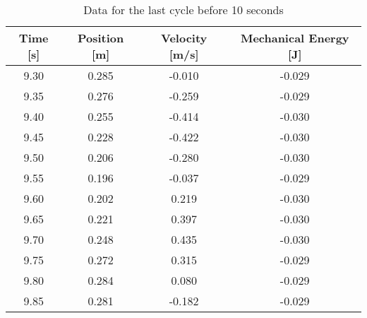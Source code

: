 \documentclass{article}
\begin{document}
            \begin{table}[H]
                \centering
                \begin{tabular}{|c|c|c|c|}
                    \hline
                    Time [s] & Position [m] & Velocity [m/s] & Mechanical Energy [J] \\
                    \hline
                    9.30     & 0.285        & -0.010         & -0.029                \\
                    \hline
                    9.35     & 0.276        & -0.259         & -0.029                \\
                    \hline
                    9.40     & 0.255        & -0.414         & -0.030                \\
                    \hline
                    9.45     & 0.228        & -0.422         & -0.030                \\
                    \hline
                    9.50     & 0.206        & -0.280         & -0.030                \\
                    \hline
                    9.55     & 0.196        & -0.037         & -0.029                \\
                    \hline
                    9.60     & 0.202        & 0.219          & -0.030                \\
                    \hline
                    9.65     & 0.221        & 0.397          & -0.030                \\
                    \hline
                    9.70     & 0.248        & 0.435          & -0.030                \\
                    \hline
                    9.75     & 0.272        & 0.315          & -0.029                \\
                    \hline
                    9.80     & 0.284        & 0.080          & -0.029                \\
                    \hline
                    9.85     & 0.281        & -0.182         & -0.029                \\
                    \hline
                \end{tabular} %
                \caption{Data for the last cycle before 10 seconds}\label{tab:last-cycle-before-10-seconds-mechanical-energy-table}
            \end{table}
            
\end{document}
